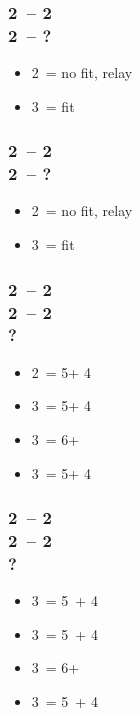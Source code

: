\documentclass[12pt, a4paper]{article}
\begin{document}
\subsubsection*{2\clubs\ -- 2\diams \\ 2\hearts\ -- ?}
\begin{itemize}
    \item 2\spades\ = no fit, relay
    \item 3\hearts\ = fit
\end{itemize}

\subsubsection*{2\clubs\ -- 2\diams \\ 2\spades\ -- ?}
\begin{itemize}
    \item 2\nt\ = no fit, relay
    \item 3\spades\ = fit
\end{itemize}

\subsubsection*{2\clubs\ -- 2\diams \\ 
                2\hearts\ -- 2\spades \\
                ?}
\begin{itemize}
    \item 2\nt\ = 5\hearts + 4\clubs
    \item 3\clubs\ = 5\hearts + 4\diams
    \item 3\diams\ = 6+\hearts
    \item 3\hearts\ = 5\hearts + 4\spades
\end{itemize}

\subsubsection*{2\clubs\ -- 2\diams \\ 
                2\spades\ -- 2\ntx \\
                ?}
\begin{itemize}
    \item 3\clubs\ = 5\spades\ + 4\diams
    \item 3\diams\ = 5\spades\ + 4\hearts
    \item 3\hearts\ = 6+\spades
    \item 3\spades\ = 5\spades\ + 4\clubs
\end{itemize}

\end{document}
